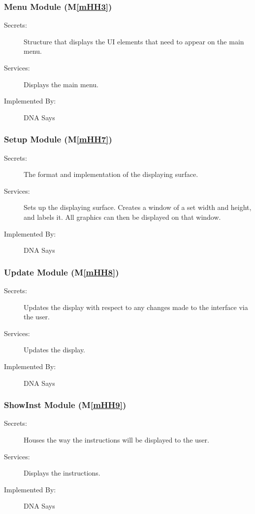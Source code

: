 \documentclass[12pt, titlepage]{article}
\newcommand{\mref}[1]{M\ref{#1}}
\begin{document}
\subsubsection{Menu Module (\mref{mHH3})}
\begin{description}
\item[Secrets:] Structure that displays the UI elements that need to appear on the main menu.
\item[Services:]Displays the main menu.
\item[Implemented By:] DNA Says
\end{description}

\subsubsection{Setup Module (\mref{mHH7})}
\begin{description}
\item[Secrets:]The format and implementation of the displaying surface.
\item[Services:]Sets up the displaying surface. Creates a window of a set width and height, and labels it. All graphics can then be displayed on that window.
\item[Implemented By:] DNA Says
\end{description}

\subsubsection{Update Module (\mref{mHH8})}
\begin{description}
\item[Secrets:] Updates the display with respect to any changes made to the interface via the user. 
\item[Services:]Updates the display.
\item[Implemented By:] DNA Says
\end{description}

\subsubsection{ShowInst Module (\mref{mHH9})}
\begin{description}
\item[Secrets:] Houses the way the instructions will be displayed to the user.
\item[Services:]Displays the instructions.
\item[Implemented By:] DNA Says
\end{description}
\end{document}
